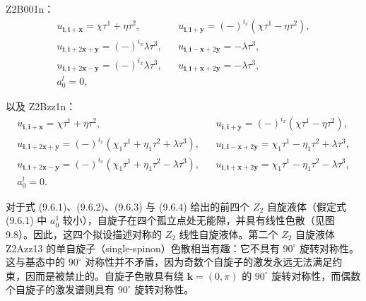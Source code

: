 Z2B001n：
\begin{equation*}
\begin{array}{rcl}
u_{\pmb{i},\pmb{i}+\pmb{x}}=\chi\tau^{1}+\eta\tau^{2}, & & u_{\pmb{i},\pmb{i}+\pmb{y}}=(-)^{i_{x}}(\chi\tau^{1}-\eta\tau^{2}),\\[2pt]
u_{\pmb{i},\pmb{i}+2\pmb{x}+\pmb{y}}=(-)^{i_{x}}\lambda\tau^{3}, & & u_{\pmb{i},\pmb{i}-\pmb{x}+2\pmb{y}}=-\lambda\tau^{3},\\[2pt]
u_{\pmb{i},\pmb{i}+2\pmb{x}-\pmb{y}}=(-)^{i_{x}}\lambda\tau^{3}, & & u_{\pmb{i},\pmb{i}+\pmb{x}+2\pmb{y}}=-\lambda\tau^{3},\\[2pt]
a_{0}^{l}=0, & &
\end{array}
\tag{9.6.7}
\end{equation*}

以及 Z2Bzz1n：
\begin{equation*}
\begin{array}{rcl}
u_{\pmb{i},\pmb{i}+\pmb{x}}=\chi\tau^{1}+\eta\tau^{2}, & & u_{\pmb{i},\pmb{i}+\pmb{y}}=(-)^{i_{x}}(\chi\tau^{1}-\eta\tau^{2}),\\[2pt]
u_{\pmb{i},\pmb{i}+2\pmb{x}+\pmb{y}}=(-)^{i_{x}}(\chi_{1}\tau^{1}+\eta_{1}\tau^{2}+\lambda\tau^{3}), & & u_{\pmb{i},\pmb{i}-\pmb{x}+2\pmb{y}}=\chi_{1}\tau^{1}-\eta_{1}\tau^{2}+\lambda\tau^{3},\\[2pt]
u_{\pmb{i},\pmb{i}+2\pmb{x}-\pmb{y}}=(-)^{i_{x}}(\chi_{1}\tau^{1}+\eta_{1}\tau^{2}-\lambda\tau^{3}), & & u_{\pmb{i},\pmb{i}+\pmb{x}+2\pmb{y}}=\chi_{1}\tau^{1}-\eta_{1}\tau^{2}-\lambda\tau^{3},\\[2pt]
a_{0}^{l}=0. & &
\end{array}
\tag{9.6.8}
\end{equation*}

对于式 (9.6.1)、(9.6.2)、(9.6.3) 与 (9.6.4) 给出的前四个 $Z_{2}$ 自旋液体（假定式 (9.6.1) 中 $a_{0}^{1}$ 较小），自旋子在四个孤立点处无能隙，并具有线性色散（见图 9.8）。因此，这四个拟设描述对称的 $Z_{2}$ 线性自旋液体。第二个 $Z_{2}$ 自旋液体 Z2Azz13 的单自旋子（single-spinon）色散相当有趣：它不具有 $90^{\circ}$ 旋转对称性。这与基态中的 $90^{\circ}$ 对称性并不矛盾，因为奇数个自旋子的激发永远无法满足约束，因而是被禁止的。自旋子色散具有绕 $\pmb{k}=(0,\pi)$ 的 $90^{\circ}$ 旋转对称性，而偶数个自旋子的激发谱则具有 $90^{\circ}$ 旋转对称性。


